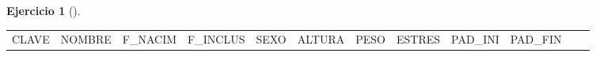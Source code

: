 \documentclass[
  a4paper,
]{scrreport}
\theoremstyle{definition}
\newtheorem{exercise}{Ejercicio}[chapter]
\theoremstyle{remark}
\begin{document}
\begin{exercise}[]
\begin{enumerate}
\begin{tcolorbox}
  \begin{longtable}[]{@{}
    >{\raggedleft\arraybackslash}p{}
    >{\raggedright\arraybackslash}p{}
    >{\raggedright\arraybackslash}p{}
    >{\raggedright\arraybackslash}p{}
    >{\raggedleft\arraybackslash}p{}
    >{\raggedleft\arraybackslash}p{}
    >{\raggedleft\arraybackslash}p{}
    >{\raggedleft\arraybackslash}p{}
    >{\raggedleft\arraybackslash}p{}
    >{\raggedleft\arraybackslash}p{}
    >{\raggedleft\arraybackslash}p{}
    >{\raggedleft\arraybackslash}p{}@{}}
  \toprule\noalign{}
  \begin{minipage}[b]{\linewidth}\raggedleft
  CLAVE
  \end{minipage} & \begin{minipage}[b]{\linewidth}\raggedright
  NOMBRE
  \end{minipage} & \begin{minipage}[b]{\linewidth}\raggedright
  F\_NACIM
  \end{minipage} & \begin{minipage}[b]{\linewidth}\raggedright
  F\_INCLUS
  \end{minipage} & \begin{minipage}[b]{\linewidth}\raggedleft
  SEXO
  \end{minipage} & \begin{minipage}[b]{\linewidth}\raggedleft
  ALTURA
  \end{minipage} & \begin{minipage}[b]{\linewidth}\raggedleft
  PESO
  \end{minipage} & \begin{minipage}[b]{\linewidth}\raggedleft
  ESTRES
  \end{minipage} & \begin{minipage}[b]{\linewidth}\raggedleft
  PAD\_INI
  \end{minipage} & \begin{minipage}[b]{\linewidth}\raggedleft
  PAD\_FIN
  \end{minipage} & \begin{minipage}[b]{\linewidth}\raggedleft

\end{minipage}
\end{longtable}
\end{tcolorbox}
\end{enumerate}
\end{exercise}
\end{document}
